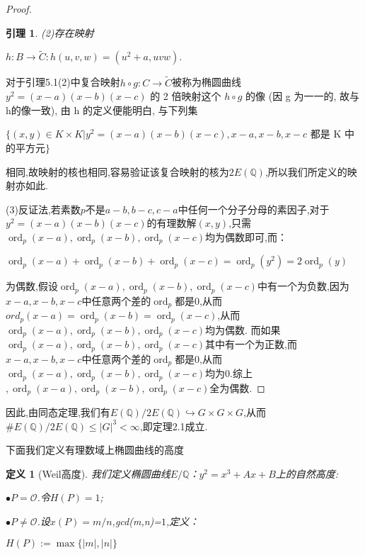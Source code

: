 \documentclass[11pt]{ctexart}
\DeclareMathOperator{\Max}{max}
\DeclareMathOperator{\Ord}{ord}
\newtheorem{defi}{定义}[section]
\newtheorem{lem}{引理}[section]
\begin{document}
\begin{proof}
\begin{lem}
(2)存在映射

\begin{center}
    
    $h:B\rightarrow \widetilde{C}: h(u, v, w) = (u^2 + a, uvw).$
\end{center}

\end{lem}

对于引理5.1(2)中复合映射$ h\circ g : C \rightarrow \widetilde{C} $被称为椭圆曲线 $y^2 = (x-a)(x-b)(x-c)$ 的 2 倍映射这个 $ h\circ g$ 的像 (因 g 为一一的, 故与 h的像一致), 
由 h 的定义便能明白, 与下列集
\begin{center}
   $ \{(x, y) \in K \times K | y^2 = (x-a)(x-b)(x-c), x-a, x-b, x-c$ 都是 K 中的平方元$\}$
\end{center}

\noindent

相同,故映射的核也相同,容易验证该复合映射的核为$2E(\mathbb{Q})$,所以我们所定义的映射亦如此.

(3)反证法,若素数$p$不是$a-b,b-c,c-a$中任何一个分子分母的素因子,对于$ y^2 = (x-a)(x-b)(x-c)$的有理数解$(x,y)$,只需$\Ord_p(x-a),\Ord_p(x-b),\Ord_p(x-c)$均为偶数即可,而：

\begin{center}
    $\Ord_p(x-a)+\Ord_p(x-b)+\Ord_p(x-c)=\Ord_p(y^2)=2\Ord_p(y)$
\end{center}

\noindent 为偶数,假设$\Ord_p(x-a),\Ord_p(x-b),\Ord_p(x-c)$中有一个为负数,因为$x-a,x-b,x-c$中任意两个差的$\Ord_p$都是0,从而$ord_p(x-a)=\Ord_p(x-b)=\Ord_p(x-c)$,从而$\Ord_p(x-a),\Ord_p(x-b),\Ord_p(x-c)$均为偶数.
而如果$\Ord_p(x-a),\Ord_p(x-b),\Ord_p(x-c)$其中有一个为正数,而$x-a,x-b,x-c$中任意两个差的$\Ord_p$都是0,从而$\Ord_p(x-a),\Ord_p(x-b),\Ord_p(x-c)$均为0.综上$,\Ord_p(x-a),\Ord_p(x-b),\Ord_p(x-c)$全为偶数.
\end{proof}









\noindent
因此,由同态定理,我们有$E(\mathbb{Q})/2E(\mathbb{Q})\hookrightarrow G\times G\times G$,从而$\# E(\mathbb{Q})/2E(\mathbb{Q})\leqslant |G|^3<\infty$,即定理2.1成立.

下面我们定义有理数域上椭圆曲线的高度

\begin{defi}[Weil高度]\label{Naive Height}
我们定义椭圆曲线$E/\mathbb{Q}$：$y^2=x^3+Ax+B$上的自然高度:

$\bullet P=\mathcal{O}$.令$H(P)=1$;

$\bullet P\neq \mathcal{O}$.设$x(P)=m/n$,gcd(m,n)=$1$,定义：

\begin{center}
    $H(P):=\Max\{|m|,|n|\}$
\end{center}

\end{defi}
\end{document}
